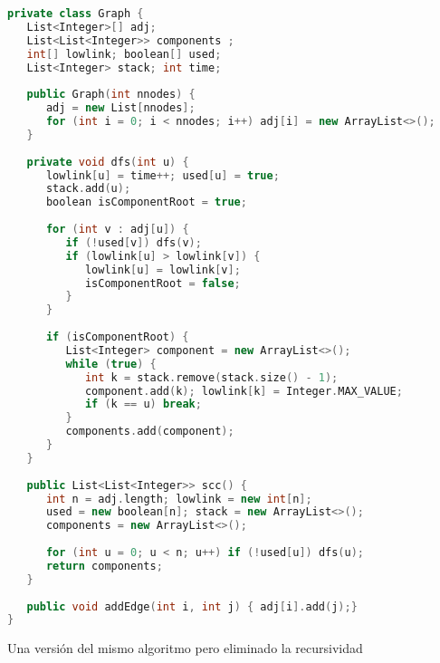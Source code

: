 \begin{lstlisting}[language=C++]
private class Graph {
   List<Integer>[] adj;
   List<List<Integer>> components ;
   int[] lowlink; boolean[] used;
   List<Integer> stack; int time;
   
   public Graph(int nnodes) {
      adj = new List[nnodes];
      for (int i = 0; i < nnodes; i++) adj[i] = new ArrayList<>();
   }
   
   private void dfs(int u) {
      lowlink[u] = time++; used[u] = true;
      stack.add(u);
      boolean isComponentRoot = true;
		
      for (int v : adj[u]) {
         if (!used[v]) dfs(v);
         if (lowlink[u] > lowlink[v]) {
            lowlink[u] = lowlink[v];
            isComponentRoot = false;
         }
      }
		
      if (isComponentRoot) {
         List<Integer> component = new ArrayList<>();
         while (true) {
            int k = stack.remove(stack.size() - 1);
            component.add(k); lowlink[k] = Integer.MAX_VALUE;
            if (k == u) break;
         }
         components.add(component);
      }
   }
	
   public List<List<Integer>> scc() {
      int n = adj.length; lowlink = new int[n];
      used = new boolean[n]; stack = new ArrayList<>();
      components = new ArrayList<>();
      
      for (int u = 0; u < n; u++) if (!used[u]) dfs(u);
      return components;
   }
	
   public void addEdge(int i, int j) { adj[i].add(j);}
}
\end{lstlisting}

Una versión del mismo algoritmo pero eliminado la recursividad

